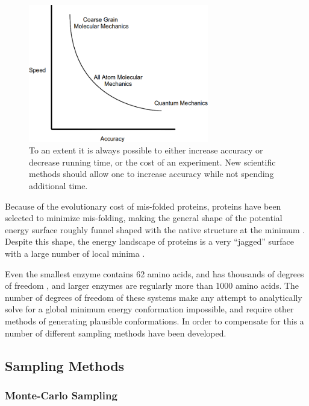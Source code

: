\begin{figure}[h]
\begin{center}
\includegraphics[width=0.7\textwidth]{figures/conservation_of_annoyance.png}
\caption{To an extent it is always possible to either increase accuracy or decrease running time, or the cost of an experiment.
New scientific methods should allow one to increase accuracy while not spending additional time.}
\label{figure:conservation_of_annoyance}
\end{center}
\end{figure}

Because of the evolutionary cost of mis-folded proteins, proteins have been selected to minimize mis-folding, making the general shape of the potential energy surface roughly funnel shaped with the native structure at the minimum \cite{leopold1992protein}.
Despite this shape, the energy landscape of proteins is a very ``jagged'' surface with a large number of local minima \cite{tsai1999folding}.

Even the smallest enzyme contains 62 amino acids, and has thousands of degrees of freedom \cite{chen19924}, and larger enzymes are regularly more than 1000 amino acids.
The number of degrees of freedom of these systems make any attempt to analytically solve for a global minimum energy conformation impossible, and require other methods of generating plausible conformations.
In order to compensate for this a number of different sampling methods have been developed.

\subsection{Sampling Methods}
\label{subsection:sampling_methods}

\subsubsection{Monte-Carlo Sampling}
\label{subsubsection:monte_carlo}


